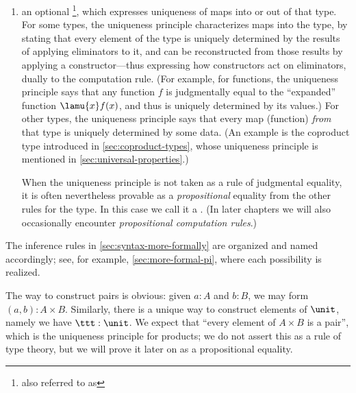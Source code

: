 \begin{rmk}
\begin{enumerate}
  \item 
    an optional \footnote{also referred to as }, which expresses
uniqueness of maps into or out of that type.  
For some types, the uniqueness principle characterizes maps into the type, by stating that 
every element of the type is uniquely determined by the results of applying eliminators to it, and can be reconstructed from those results by applying a constructor---thus expressing how constructors act on eliminators, dually to the computation rule.  
(For example, for functions, the uniqueness principle says that any function $f$ is judgmentally equal to the ``expanded'' function $\lamu{x} f(x)$, and thus is uniquely determined by its values.)
For other types, the uniqueness principle says that every map (function) \emph{from} that type is uniquely determined by some data. (An example is the coproduct type introduced in \cref{sec:coproduct-types}, whose uniqueness principle is mentioned in \cref{sec:universal-properties}.)  
    
    When the uniqueness principle is not taken as a rule of judgmental equality, it is often nevertheless provable as a \emph{propositional} equality from the other rules for the type.
    In this case we call it a .
    (In later chapters we will also occasionally encounter \emph{propositional computation rules}.)
  \end{enumerate}
The inference rules in \cref{sec:syntax-more-formally} are organized and named accordingly; see, for example, \cref{sec:more-formal-pi}, where each possibility is realized.
\end{rmk}

The way to construct pairs is obvious: given $a:A$ and $b:B$, we may form $(a,b):A\times B$.
Similarly, there is a unique way to construct elements of $\unit$, namely we have $\ttt:\unit$.
We expect that ``every element of $A\times B$ is a pair'', which is the uniqueness principle for products; we do not assert this as a rule of type theory, but we will prove it later on as a propositional equality.

